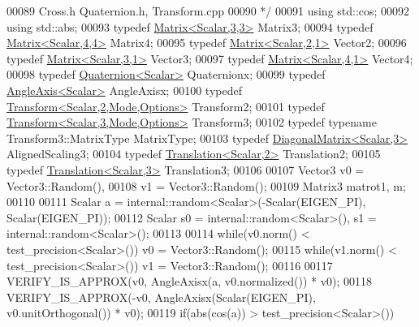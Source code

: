\begin{DoxyCode}
00089 \textcolor{comment}{     Cross.h Quaternion.h, Transform.cpp}
00090 \textcolor{comment}{  */}
00091   \textcolor{keyword}{using} std::cos;
00092   \textcolor{keyword}{using} std::abs;
00093   \textcolor{keyword}{typedef} \hyperlink{group___core___module_class_eigen_1_1_matrix}{Matrix<Scalar,3,3>} Matrix3;
00094   \textcolor{keyword}{typedef} \hyperlink{group___core___module_class_eigen_1_1_matrix}{Matrix<Scalar,4,4>} Matrix4;
00095   \textcolor{keyword}{typedef} \hyperlink{group___core___module_class_eigen_1_1_matrix}{Matrix<Scalar,2,1>} Vector2;
00096   \textcolor{keyword}{typedef} \hyperlink{group___core___module}{Matrix<Scalar,3,1>} Vector3;
00097   \textcolor{keyword}{typedef} \hyperlink{group___core___module_class_eigen_1_1_matrix}{Matrix<Scalar,4,1>} Vector4;
00098   \textcolor{keyword}{typedef} \hyperlink{group___geometry___module_class_eigen_1_1_quaternion}{Quaternion<Scalar>} Quaternionx;
00099   \textcolor{keyword}{typedef} \hyperlink{group___geometry___module_class_eigen_1_1_angle_axis}{AngleAxis<Scalar>} AngleAxisx;
00100   \textcolor{keyword}{typedef} \hyperlink{group___geometry___module_class_eigen_1_1_transform}{Transform<Scalar,2,Mode,Options>} Transform2;
00101   \textcolor{keyword}{typedef} \hyperlink{group___geometry___module_class_eigen_1_1_transform}{Transform<Scalar,3,Mode,Options>} Transform3;
00102   \textcolor{keyword}{typedef} \textcolor{keyword}{typename} Transform3::MatrixType MatrixType;
00103   \textcolor{keyword}{typedef} \hyperlink{group___core___module_class_eigen_1_1_diagonal_matrix}{DiagonalMatrix<Scalar,3>} AlignedScaling3;
00104   \textcolor{keyword}{typedef} \hyperlink{group___geometry___module_class_eigen_1_1_translation}{Translation<Scalar,2>} Translation2;
00105   \textcolor{keyword}{typedef} \hyperlink{group___geometry___module_class_eigen_1_1_translation}{Translation<Scalar,3>} Translation3;
00106 
00107   Vector3 v0 = Vector3::Random(),
00108           v1 = Vector3::Random();
00109   Matrix3 matrot1, m;
00110 
00111   Scalar a = internal::random<Scalar>(-Scalar(EIGEN\_PI), Scalar(EIGEN\_PI));
00112   Scalar s0 = internal::random<Scalar>(), s1 = internal::random<Scalar>();
00113   
00114   \textcolor{keywordflow}{while}(v0.norm() < test\_precision<Scalar>()) v0 = Vector3::Random();
00115   \textcolor{keywordflow}{while}(v1.norm() < test\_precision<Scalar>()) v1 = Vector3::Random();
00116 
00117   VERIFY\_IS\_APPROX(v0, AngleAxisx(a, v0.normalized()) * v0);
00118   VERIFY\_IS\_APPROX(-v0, AngleAxisx(Scalar(EIGEN\_PI), v0.unitOrthogonal()) * v0);
00119   \textcolor{keywordflow}{if}(abs(cos(a)) > test\_precision<Scalar>())

\end{DoxyCode}
